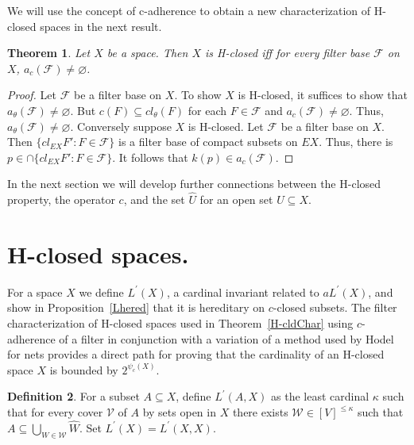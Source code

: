 \documentclass[11pt]{amsart}
\newif\ifdraft\draftfalse
\newtheorem{theorem}{Theorem}[section]
\theoremstyle{definition}
\newtheorem{definition}[theorem]{Definition}
\theoremstyle{remark}
\numberwithin{equation}{section}
\begin{document}
We will use the concept of c-adherence to obtain a new characterization of H-closed spaces in the next result. 

\begin{theorem}{{\immediate{}}{\ifdraft\hspace{-\lastskip}\vadjust{\vspace{-1mm}\smash{\llap{{\tt {{H-cldChar}}}\hspace{8mm}}}\vspace{1mm}}\fi}} Let $X$ be a space.  Then  $X$ is H-closed iff
for every filter base ${\ensuremath{\mathcal{F}}}$ on $X$, $a_c({\ensuremath{\mathcal{F}}}) \ne \varnothing$.
\end{theorem}

\begin{proof}  Let $\mathcal F$ be a filter base on $X$. To show $X$ is H-closed, it suffices to show that $a_{\theta}(\mathcal F) \ne \varnothing$.  But $c(F) \subseteq cl_{\theta}(F)$ for each $F \in \mathcal F$ and $a_c(\mathcal F) \ne  \varnothing$. Thus, $a_{\theta}(\mathcal F) \ne \varnothing$.  Conversely suppose $X$ is H-closed.  Let $\mathcal F$ be a filter base on $X$. Then $\{cl_{EX}F':F \in \mathcal F \}$ is a filter base of compact subsets on $EX$.  Thus, there is $p \in \cap \{cl_{EX}F':F \in \mathcal F \}$.  It follows that $k(p) \in a_c(\mathcal F)$.
\end{proof}

In the next section we will develop further connections between the H-closed property, the operator $c$, and the set $\widehat{U}$ for an open set $U{\subseteq} X$.

\section{H-closed spaces.}

For a space $X$ we define $L^\prime(X)$, a cardinal invariant related to $aL^\prime(X)$, and show in Proposition~\ref{Lhered} that it is hereditary on $c$-closed subsets. 
The filter characterization of H-closed spaces used in Theorem~\ref{H-cldChar} using $c$-adherence of a filter in conjunction with a variation of a method used by Hodel ~\cite{Hodel2006} for nets provides a direct path for proving that the cardinality of an H-closed space $X$ is bounded by $2^{\psi_c(X)}$.

\begin{definition}{{\immediate{}}{\ifdraft\hspace{-\lastskip}\vadjust{\vspace{-1mm}\smash{\llap{{\tt {{lprime}}}\hspace{8mm}}}\vspace{1mm}}\fi}}
For a subset $A{\subseteq} X$, define $L^\prime(A,X)$ as the least cardinal $\kappa$ such that for every cover ${\ensuremath{\mathcal{{V}}}}$ of $A$ by sets open in $X$ there exists ${\ensuremath{\mathcal{{W}}}}\in[V]^{\leq\kappa}$ such that $A{\subseteq}{\bigcup}_{W\in{\ensuremath{\mathcal{{W}}}}}\widehat{W}$. Set $L^\prime(X)=L^\prime(X,X)$. 
\end{definition}
\end{document}
